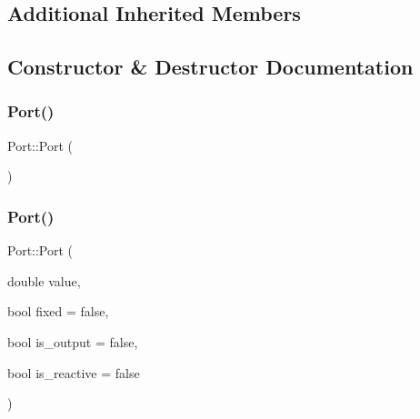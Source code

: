 \subsection*{Additional Inherited Members}


\subsection{Constructor \& Destructor Documentation}
\mbox{\label{class_port_a2cfb70a4b6d730e715042d646ec1d960}} 
\subsubsection{\texorpdfstring{Port()}{Port()}\hspace{0.1cm}{\footnotesize\ttfamily [1/3]}}
{\footnotesize\ttfamily Port\+::\+Port (\begin{DoxyParamCaption}{ }\end{DoxyParamCaption})\hspace{0.3cm}{\ttfamily [inline]}}

\mbox{\label{class_port_abc59e965682f281264a8488a46408a6f}} 
\subsubsection{\texorpdfstring{Port()}{Port()}\hspace{0.1cm}{\footnotesize\ttfamily [2/3]}}
{\footnotesize\ttfamily Port\+::\+Port (\begin{DoxyParamCaption}\item[{double}]{value,  }\item[{bool}]{fixed = {\ttfamily false},  }\item[{bool}]{is\+\_\+output = {\ttfamily false},  }\item[{bool}]{is\+\_\+reactive = {\ttfamily false} }\end{DoxyParamCaption})\hspace{0.3cm}{\ttfamily [inline]}}

\mbox{\label{class_port_a7eb1db139cc954b15e0d182ad3244067}} 
